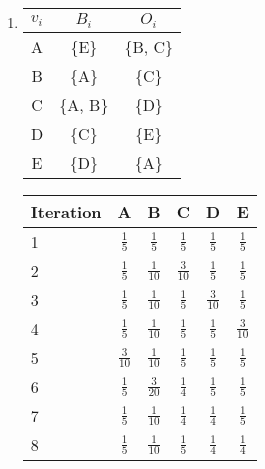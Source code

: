 \documentclass[ngerman]{scrartcl}
\begin{document}
\begin{enumerate}[label=\alph*)]
\begin{enumerate}[label=\Roman*)]
      \item
      \begin{tabular}{|*{3}{c|}}
        \hline
        $v_i$ & $B_i$ & $O_i$    \\
        \hline
        A & \{E\}     & \{B, C\} \\
        \hline
        B & \{A\}     & \{C\}    \\
        \hline
        C & \{A, B\}  & \{D\}    \\
        \hline
        D & \{C\}     & \{E\}    \\
        \hline
        E & \{D\}     & \{A\}    \\
        \hline
      \end{tabular}
      \begin{doublespacing}
        \begin{tabular}{|l|*{5}{c|}}
          \hline
          Iteration & A & B & C & D & E \\
          \hline
          1 & $\frac{1}{5}$ & $\frac{1}{5}$ & $\frac{1}{5}$ & $\frac{1}{5}$ & $\frac{1}{5}$ \\
          \hline
          2 & $\frac{1}{5}$ & $\frac{1}{10}$ & $\frac{3}{10}$ & $\frac{1}{5}$ & $\frac{1}{5}$ \\
          \hline
          3 & $\frac{1}{5}$ & $\frac{1}{10}$ & $\frac{1}{5}$ & $\frac{3}{10}$ & $\frac{1}{5}$ \\
          \hline
          4 & $\frac{1}{5}$ & $\frac{1}{10}$ & $\frac{1}{5}$ & $\frac{1}{5}$ & $\frac{3}{10}$ \\
          \hline
          5 & $\frac{3}{10}$ & $\frac{1}{10}$ & $\frac{1}{5}$ & $\frac{1}{5}$ & $\frac{1}{5}$ \\
          \hline
          6 & $\frac{1}{5}$ & $\frac{3}{20}$ & $\frac{1}{4}$ & $\frac{1}{5}$ & $\frac{1}{5}$ \\
          \hline
          7 & $\frac{1}{5}$ & $\frac{1}{10}$ & $\frac{1}{4}$ & $\frac{1}{4}$ & $\frac{1}{5}$ \\
          \hline
          8 & $\frac{1}{5}$ & $\frac{1}{10}$ & $\frac{1}{5}$ & $\frac{1}{4}$ & $\frac{1}{4}$ \\
          \hline
        \end{tabular}
      \end{doublespacing}
    \end{enumerate}


\end{enumerate}
\end{document}
